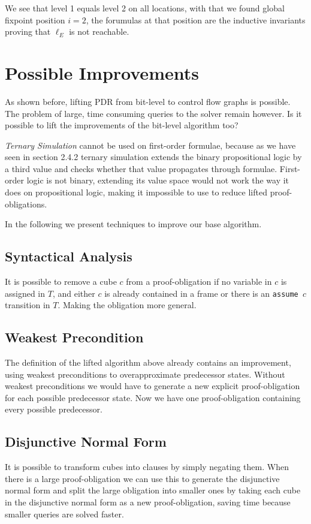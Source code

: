 \documentclass[11pt, a4paper, BCOR=10mm, ngerman]{scrbook}
\begin{document}
\hspace*{5cm}

We see that level 1 equals level 2 on all locations, with that we found global fixpoint position $i = 2$, the forumulas at that position are the inductive invariants proving that $\ell_E$ is not reachable.


\section{Possible Improvements}
\label{improvements}

As shown before, lifting PDR from bit-level to control flow graphs is possible. The problem of large, time consuming queries to the solver remain however. Is it possible to lift the improvements of the bit-level algorithm too? \par

\textsl{Ternary Simulation} cannot be used on first-order formulae, because as we have seen in section 2.4.2 ternary simulation extends the binary propositional logic by a third value and checks whether that value propagates through formulae. First-order logic is not binary, extending its value space would not work the way it does on propositional logic,
making it impossible to use to reduce lifted proof-obligations. \par
In the following we present techniques to improve our base algorithm.
\subsection{Syntactical Analysis}
It is possible to remove a cube $c$ from a proof-obligation if no variable in $c$ is assigned in $T$, and either $c$ is already contained in a frame or there is an \texttt{assume $c$} transition in $T$. Making the obligation more general.


\subsection{Weakest Precondition}
The definition of the lifted algorithm above already contains an improvement, using weakest preconditions to overapproximate predecessor states. Without weakest preconditions we would have to generate a new explicit proof-obligation for each possible predecessor state. Now we have one proof-obligation containing every possible predecessor.


\subsection{Disjunctive Normal Form}
It is possible to transform cubes into clauses by simply negating them. When there is a large proof-obligation we can use this to generate the disjunctive normal form and split the large obligation into smaller ones by taking each cube in the disjunctive normal form as a new proof-obligation, saving time because smaller queries are solved faster.
\end{document}

